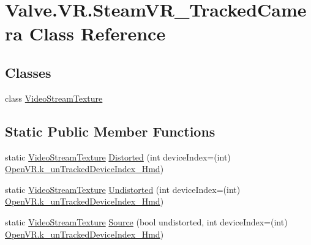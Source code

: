 \hypertarget{class_valve_1_1_v_r_1_1_steam_v_r___tracked_camera}{}\section{Valve.\+V\+R.\+Steam\+V\+R\+\_\+\+Tracked\+Camera Class Reference}
\label{class_valve_1_1_v_r_1_1_steam_v_r___tracked_camera}
\subsection*{Classes}
\begin{DoxyCompactItemize}
\item 
class \mbox{\hyperlink{class_valve_1_1_v_r_1_1_steam_v_r___tracked_camera_1_1_video_stream_texture}{Video\+Stream\+Texture}}
\end{DoxyCompactItemize}
\subsection*{Static Public Member Functions}
\begin{DoxyCompactItemize}
\item 
static \mbox{\hyperlink{class_valve_1_1_v_r_1_1_steam_v_r___tracked_camera_1_1_video_stream_texture}{Video\+Stream\+Texture}} \mbox{\hyperlink{class_valve_1_1_v_r_1_1_steam_v_r___tracked_camera_af614d0ab93dbc37820059511bc5a838a}{Distorted}} (int device\+Index=(int) \mbox{\hyperlink{class_valve_1_1_v_r_1_1_open_v_r_ae12d105c6f832aa4524e2608b26896e0}{Open\+V\+R.\+k\+\_\+un\+Tracked\+Device\+Index\+\_\+\+Hmd}})
\item 
static \mbox{\hyperlink{class_valve_1_1_v_r_1_1_steam_v_r___tracked_camera_1_1_video_stream_texture}{Video\+Stream\+Texture}} \mbox{\hyperlink{class_valve_1_1_v_r_1_1_steam_v_r___tracked_camera_aa00f26ee2d0be48d102d08fcca88f238}{Undistorted}} (int device\+Index=(int) \mbox{\hyperlink{class_valve_1_1_v_r_1_1_open_v_r_ae12d105c6f832aa4524e2608b26896e0}{Open\+V\+R.\+k\+\_\+un\+Tracked\+Device\+Index\+\_\+\+Hmd}})
\item 
static \mbox{\hyperlink{class_valve_1_1_v_r_1_1_steam_v_r___tracked_camera_1_1_video_stream_texture}{Video\+Stream\+Texture}} \mbox{\hyperlink{class_valve_1_1_v_r_1_1_steam_v_r___tracked_camera_a474c92d43ed5f58a47164e04fa1d738d}{Source}} (bool undistorted, int device\+Index=(int) \mbox{\hyperlink{class_valve_1_1_v_r_1_1_open_v_r_ae12d105c6f832aa4524e2608b26896e0}{Open\+V\+R.\+k\+\_\+un\+Tracked\+Device\+Index\+\_\+\+Hmd}})
\end{DoxyCompactItemize}


